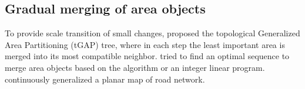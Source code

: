 \documentclass{ica}
\begin{document}


%
%

\subsection{Gradual merging of area objects}
To provide scale transition of small changes, 
\citet{vanOosterom2005} proposed 
the topological Generalized Area Partitioning (tGAP) tree,
where in each step the least important area is merged into
its most compatible neighbor.
\citet[]{Peng2019Thesis} tried to 
find an optimal sequence to merge area objects 
based on the \Astar algorithm or an integer linear program.
\citet{Suba2016Road} continuously generalized a planar map of road network.
\end{document}
